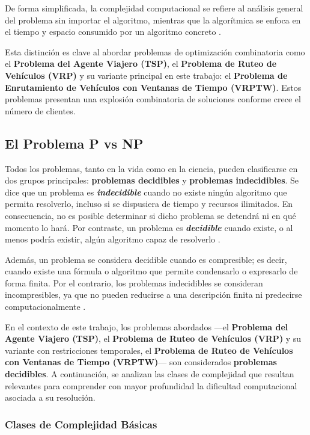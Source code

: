 \documentclass[12pt,titlepage,twoside,openright]{book}
\begin{document}
De forma simplificada, la complejidad computacional se refiere al análisis general del problema sin importar el algoritmo, mientras que la algorítmica se enfoca en el tiempo y espacio consumido por un algoritmo concreto \citep{maldonado2013problema}.

Esta distinción es clave al abordar problemas de optimización combinatoria como el \textbf{Problema del Agente Viajero (TSP)}, el \textbf{Problema de Ruteo de Vehículos (VRP)} y su variante principal en este trabajo: el \textbf{Problema de Enrutamiento de Vehículos con Ventanas de Tiempo (VRPTW)}. Estos problemas presentan una explosión combinatoria de soluciones conforme crece el número de clientes.

\subsection{El Problema P vs NP}

Todos los problemas, tanto en la vida como en la ciencia, pueden clasificarse en dos grupos principales: \textbf{problemas decidibles} y \textbf{problemas indecidibles}. Se dice que un problema es \textbf{\emph{indecidible}} cuando no existe ningún algoritmo que permita resolverlo, incluso si se dispusiera de tiempo y recursos ilimitados. En consecuencia, no es posible determinar si dicho problema se detendrá ni en qué momento lo hará. Por contraste, un problema es \textbf{\emph{decidible}} cuando existe, o al menos podría existir, algún algoritmo capaz de resolverlo \citep{maldonado2013problema}.

Además, un problema se considera decidible cuando es compresible; es decir, cuando existe una fórmula o algoritmo que permite condensarlo o expresarlo de forma finita. Por el contrario, los problemas indecidibles se consideran incompresibles, ya que no pueden reducirse a una descripción finita ni predecirse computacionalmente \citep{maldonado2013problema}.

En el contexto de este trabajo, los problemas abordados —el \textbf{Problema del Agente Viajero (TSP)}, el \textbf{Problema de Ruteo de Vehículos (VRP)} y su variante con restricciones temporales, el \textbf{Problema de Ruteo de Vehículos con Ventanas de Tiempo (VRPTW)}— son considerados \textbf{problemas decidibles}. A continuación, se analizan las clases de complejidad que resultan relevantes para comprender con mayor profundidad la dificultad computacional asociada a su resolución.

\subsubsection{Clases de Complejidad Básicas}
\end{document}
